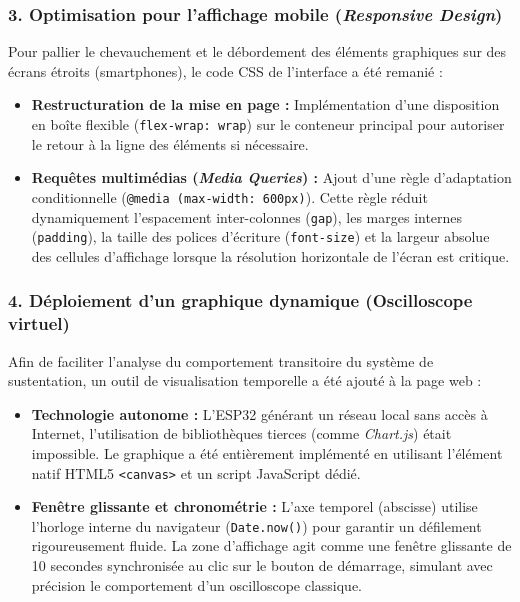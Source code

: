 \subsubsection*{3. Optimisation pour l'affichage mobile (\textit{Responsive Design})}
Pour pallier le chevauchement et le débordement des éléments graphiques sur des écrans étroits (smartphones), le code CSS de l'interface a été remanié :
\begin{itemize}
  \item \textbf{Restructuration de la mise en page :} Implémentation d'une disposition en boîte flexible (\texttt{flex-wrap: wrap}) sur le conteneur principal pour autoriser le retour à la ligne des éléments si nécessaire.
  \item \textbf{Requêtes multimédias (\textit{Media Queries}) :} Ajout d'une règle d'adaptation conditionnelle (\texttt{@media (max-width: 600px)}). Cette règle réduit dynamiquement l'espacement inter-colonnes (\texttt{gap}), les marges internes (\texttt{padding}), la taille des polices d'écriture (\texttt{font-size}) et la largeur absolue des cellules d'affichage lorsque la résolution horizontale de l'écran est critique.
\end{itemize}

\subsubsection*{4. Déploiement d'un graphique dynamique (Oscilloscope virtuel)}
Afin de faciliter l'analyse du comportement transitoire du système de sustentation, un outil de visualisation temporelle a été ajouté à la page web :
\begin{itemize}
  \item \textbf{Technologie autonome :} L'ESP32 générant un réseau local sans accès à Internet, l'utilisation de bibliothèques tierces (comme \textit{Chart.js}) était impossible. Le graphique a été entièrement implémenté en utilisant l'élément natif HTML5 \texttt{<canvas>} et un script JavaScript dédié.
  \item \textbf{Fenêtre glissante et chronométrie :} L'axe temporel (abscisse) utilise l'horloge interne du navigateur (\texttt{Date.now()}) pour garantir un défilement rigoureusement fluide. La zone d'affichage agit comme une fenêtre glissante de 10 secondes synchronisée au clic sur le bouton de démarrage, simulant avec précision le comportement d'un oscilloscope classique.
\end{itemize}

